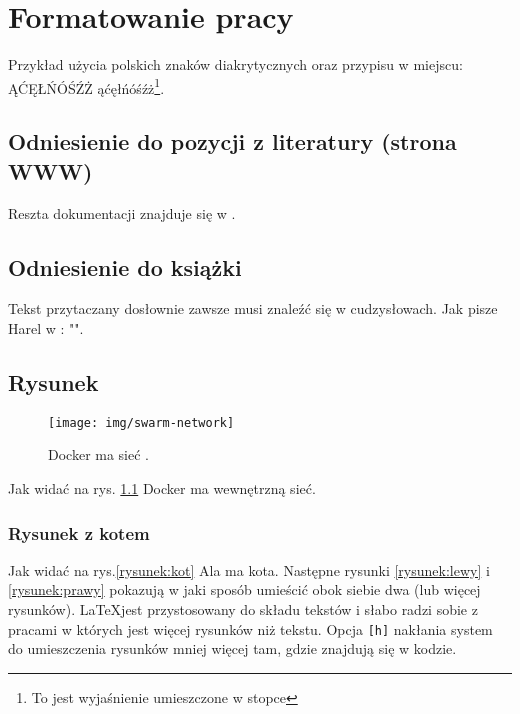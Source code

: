 
\chapter{Formatowanie pracy}

Przykład użycia polskich znaków diakrytycznych oraz przypisu w miejscu: ĄĆĘŁŃÓŚŹŻ ąćęłńóśźż\footnote{To jest wyjaśnienie umieszczone w stopce}. \lipsum[1]

\section{Odniesienie do pozycji z literatury (strona WWW)}

Reszta dokumentacji znajduje się w \cite{docker_compose_reference}. \lipsum[3]

\section{Odniesienie do książki}

Tekst przytaczany dosłownie zawsze musi znaleźć się w cudzysłowach. Jak pisze Harel w \cite{harel_rzecz_2008}: "\lipsum[1]". 

\section{Rysunek}

\begin{figure}
\centering\texttt{[image: img/swarm-network]}
\caption[Docker ma sieć]{Docker ma sieć \cite{docker_compose_reference}.}  \label{rys:network}
\end{figure}

Jak widać na rys. \ref{rys:network} Docker ma wewnętrzną sieć. \lipsum[1]


\subsection{Rysunek z kotem}

Jak widać na rys.\ref{rysunek:kot} Ala ma kota. Następne rysunki \ref{rysunek:lewy} i \ref{rysunek:prawy} pokazują w jaki sposób umieścić obok siebie dwa (lub więcej rysunków). \LaTeX jest przystosowany do składu tekstów i słabo radzi sobie z pracami w których jest więcej rysunków niż tekstu. Opcja \verb+[h]+ nakłania system do umieszczenia rysunków mniej więcej tam, gdzie znajdują się w kodzie. \lipsum[9-10] 

